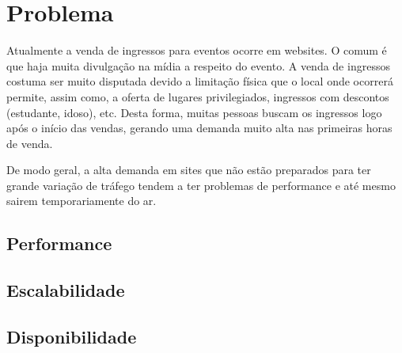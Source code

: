 \chapter{Problema}

Atualmente a venda de ingressos para eventos ocorre em websites.
O comum é que haja muita divulgação na mídia a respeito do evento.
A venda de ingressos costuma ser muito disputada devido a limitação
física que o local onde ocorrerá permite, assim como, a oferta de
lugares privilegiados, ingressos com descontos (estudante, idoso), etc.
Desta forma, muitas pessoas buscam os ingressos logo após o início das
vendas, gerando uma demanda muito alta nas primeiras horas de venda.

De modo geral, a alta demanda em sites que não estão preparados para
ter grande variação de tráfego tendem a ter problemas de performance
e até mesmo sairem temporariamente do ar.

\section{Performance}

\section{Escalabilidade}

\section{Disponibilidade}
